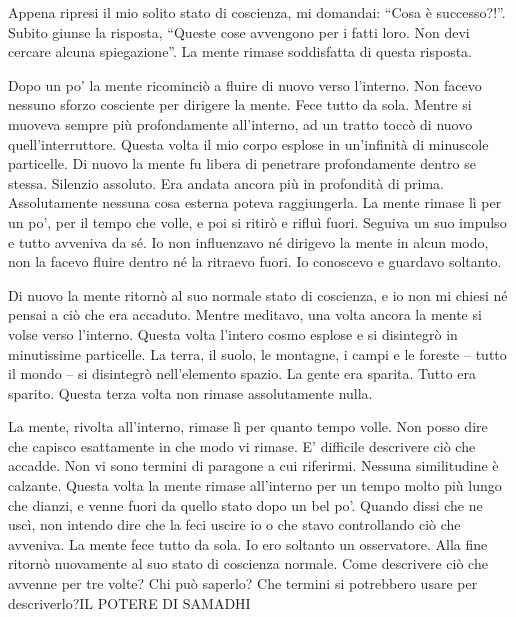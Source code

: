 Appena ripresi il mio solito stato di coscienza, mi domandai: ``Cosa è
successo?!''. Subito giunse la risposta, ``Queste cose avvengono per i
fatti loro. Non devi cercare alcuna spiegazione''. La mente rimase
soddisfatta di questa risposta.

Dopo un po' la mente ricominciò a fluire di nuovo verso l'interno. Non
facevo nessuno sforzo cosciente per dirigere la mente. Fece tutto da
sola. Mentre si muoveva sempre più profondamente all'interno, ad un
tratto toccò di nuovo quell'interruttore. Questa volta il mio corpo
esplose in un'infinità di minuscole particelle. Di nuovo la mente fu
libera di penetrare profondamente dentro se stessa. Silenzio assoluto.
Era andata ancora più in profondità di prima. Assolutamente nessuna cosa
esterna poteva raggiungerla. La mente rimase lì per un po', per il tempo
che volle, e poi si ritirò e rifluì fuori. Seguiva un suo impulso e
tutto avveniva da sé. Io non influenzavo né dirigevo la mente in alcun
modo, non la facevo fluire dentro né la ritraevo fuori. Io conoscevo e
guardavo soltanto.

Di nuovo la mente ritornò al suo normale stato di coscienza, e io non mi
chiesi né pensai a ciò che era accaduto. Mentre meditavo, una volta
ancora la mente si volse verso l'interno. Questa volta l'intero cosmo
esplose e si disintegrò in minutissime particelle. La terra, il suolo,
le montagne, i campi e le foreste -- tutto il mondo -- si disintegrò
nell'elemento spazio. La gente era sparita. Tutto era sparito. Questa
terza volta non rimase assolutamente nulla.

La mente, rivolta all'interno, rimase lì per quanto tempo volle. Non
posso dire che capisco esattamente in che modo vi rimase. E' difficile
descrivere ciò che accadde. Non vi sono termini di paragone a cui
riferirmi. Nessuna similitudine è calzante. Questa volta la mente rimase
all'interno per un tempo molto più lungo che dianzi, e venne fuori da
quello stato dopo un bel po'. Quando dissi che ne uscì, non intendo dire
che la feci uscire io o che stavo controllando ciò che avveniva. La
mente fece tutto da sola. Io ero soltanto un osservatore. Alla fine
ritornò nuovamente al suo stato di coscienza normale. Come descrivere
ciò che avvenne per tre volte? Chi può saperlo? Che termini si
potrebbero usare per descriverlo?IL POTERE DI SAMADHI


